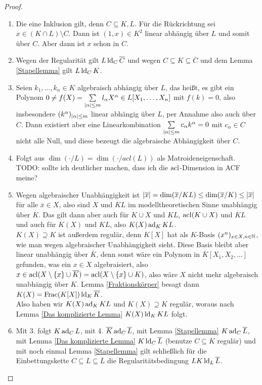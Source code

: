     \begin{proof}
    	\begin{enumerate}
    		\item Die eine Inklusion gilt, denn $C\subseteq K,L$. Für die Rückrichtung sei $x\in (K\cap L)\setminus C$. Dann ist $(1,x)\in K^2$ linear abhängig über $L$ und somit über $C$. Aber dann ist $x$ schon in $C$.
    		\item Wegen der Regularität gilt $L\operatorname{ld}_C\overline{C}$ und wegen $C\subseteq K\subseteq\overline{C}$ und dem Lemma \ref{Stapellemma} gilt $L\operatorname{ld}_C K$.
    		\item Seien $k_1,\dots,k_n\in K$ algebraisch abhängig über $L$, das heißt, es gibt ein Polynom $0\neq f(X)=\sum\limits_{{\left| \alpha \right|}\leq m}l_\alpha X^\alpha\in L[X_1,\dots,X_n]$ mit $f(k)=0$, also insbesondere $(k^\alpha)_{{\left| \alpha \right|}\leq m}$ linear abhängig über $L$, per Annahme also auch über $C$. Dann existiert aber eine Linearkombination $\sum\limits_{{\left| \alpha \right|}\leq m}c_\alpha k^\alpha=0$ mit $c_\alpha\in C$ nicht alle Null, und diese bezeugt die algebraische Abhängigkeit über $C$.
    		\item Folgt aus $\dim(\cdot/L)=\dim(\cdot/acl(L))$ als Matroideneigenschaft. TODO: sollte ich deutlicher machen, dass ich die $\operatorname{acl}$-Dimension in ACF meine?
    		\item Wegen algebraischer Unabhängigkeit ist ${\left| \overline{x} \right|}=\dim(\overline{x}/KL)\leq\dim(\overline{x}/K)\leq{\left| \overline{x} \right|}$ für alle $\overline{x}\in X$, also sind $X$ und $KL$ im modelltheoretischen Sinne unabhängig über $K$. Das gilt dann aber auch für $K\cup X$ und $KL$, $\operatorname{acl}(K\cup X)$ und $KL$ und auch für $K(X)$ und $KL$, also $K(X)\operatorname{ad}_KKL$.\\
    		$K(X)\supseteq K$ ist außerdem regulär, denn $K[X]$ hat als $K$-Basis $(x^n)_{x\in X,n\in\mathbb{N}}$, wie man wegen algebraischer Unabhängigkeit sieht. Diese Basis bleibt aber linear unabhängig über $\overline{K}$, denn sonst wäre ein Polynom in $\overline{K}[X_1,X_2,\dots]$ gefunden, was ein $x\in X$ algebraisiert, also $x\in\operatorname{acl}(X\setminus\{x\}\cup\overline{K})=\operatorname{acl}(X\setminus\{x\}\cup K)$, also wäre $X$ nicht mehr algebraisch unabhängig über $K$. Lemma \ref{Fraktionskörper} besagt dann $K(X)=\operatorname{Frac}(K[X])\operatorname{ld}_K\overline{K}$.\\
    		Also haben wir $K(X)\operatorname{ad}_KKL$ und $K(X)\supseteq K$ regulär, woraus nach Lemma \ref{Das komplizierte Lemma} $K(X)\operatorname{ld}_KKL$ folgt.
    		\item Mit 3. folgt $K\operatorname{ad}_CL$, mit 4. $\overline{K}\operatorname{ad}_C\overline{L}$, mit Lemma \ref{Stapellemma} $K\operatorname{ad}_C\overline{L}$, mit Lemma \ref{Das komplizierte Lemma} $K\operatorname{ld}_C\overline{L}$ (benutze $C\subseteq K$ regulär) und mit noch einmal Lemma \ref{Stapellemma} gilt schließlich für die Einbettungskette $C\subseteq L\subseteq\overline{L}$ die Regularitätsbedingung $LK\operatorname{ld}_L\overline{L}$.
    	\end{enumerate}
    \end{proof}
    
